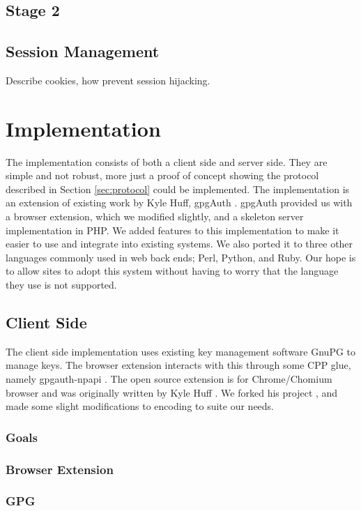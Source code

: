 \documentclass[11pt]{article}
\begin{document}
\subsection{Stage 2} \label{subsec:stage2}

\subsection{Session Management} \label{sessionManagement}
Describe cookies, how prevent session hijacking.


\section{Implementation} \label{sec:implementation}
The implementation consists of both a client side and server side. They are simple and not robust, more just a proof of concept showing the protocol described in Section \ref{sec:protocol} could be implemented. The implementation is an extension of existing work by Kyle Huff, gpgAuth \cite{gpgauth}. gpgAuth provided us with a browser extension, which we modified slightly, and a skeleton server implementation in PHP. We added features to this implementation to make it easier to use and integrate into existing systems. We also ported it to three other languages commonly used in web back ends; Perl, Python, and Ruby. Our hope is to allow sites to adopt this system without having to worry that the language they use is not supported. 

\subsection{Client Side}
The client side implementation uses existing key management software GnuPG to manage keys. The browser extension interacts with this through some CPP glue, namely gpgauth-npapi \cite{npapi}. The open source extension is for Chrome/Chomium browser and was originally written by Kyle Huff \cite{ext}. We forked his project \cite{extFork}, and made some slight modifications to encoding to suite our needs.  
\subsubsection{Goals}
\subsubsection{Browser Extension}
\subsubsection{GPG}
\end{document}
